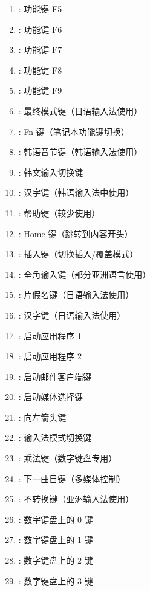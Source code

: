 \begin{enumerate}[label=\arabic*)]
    \item {}: 功能键 F5
    \item {}: 功能键 F6
    \item {}: 功能键 F7
    \item {}: 功能键 F8
    \item {}: 功能键 F9
    \item {}: 最终模式键（日语输入法使用）
    \item {}: Fn 键（笔记本功能键切换）
    \item {}: 韩语音节键（韩语输入法使用）
    \item {}: 韩文输入切换键
    \item {}: 汉字键（韩语输入法中使用）
    \item {}: 帮助键（较少使用）
    \item {}: Home 键（跳转到内容开头）
    \item {}: 插入键（切换插入/覆盖模式）
    \item {}: 全角输入键（部分亚洲语言使用）
    \item {}: 片假名键（日语输入法使用）
    \item {}: 汉字键（日语输入法使用）
    \item {}: 启动应用程序 1
    \item {}: 启动应用程序 2
    \item {}: 启动邮件客户端键
    \item {}: 启动媒体选择键
    \item {}: 向左箭头键
    \item {}: 输入法模式切换键
    \item {}: 乘法键（数字键盘专用）
    \item {}: 下一曲目键（多媒体控制）
    \item {}: 不转换键（亚洲输入法使用）
    \item {}: 数字键盘上的 0 键
    \item {}: 数字键盘上的 1 键
    \item {}: 数字键盘上的 2 键
    \item {}: 数字键盘上的 3 键

\end{enumerate}
